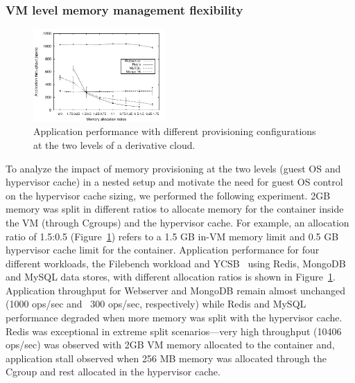 \subsubsection{VM level memory management flexibility}
\label{subsec:sdc}
%
%
\begin{figure}[t]
  \centering
\includegraphics[width=0.45\textwidth]{images/appl_behavior} 
 \caption{Application performance with different provisioning configurations 
  at the two levels of a derivative cloud.}
 \label{fig:app_behavior} 
\end{figure}
%
To analyze the impact of memory provisioning at the two 
levels (guest OS and hypervisor cache) in a nested setup and motivate the need for 
guest OS control on the hypervisor cache sizing, we performed the 
following experiment.
%
2GB memory was split in different ratios to allocate memory for the container 
inside the VM (through Cgroups) and the hypervisor cache.
%
For example, an allocation ratio of 1.5:0.5 (Figure~\ref{fig:app_behavior}) refers to
a 1.5 GB in-VM memory limit and 0.5 GB hypervisor cache limit for
the container. 
%
Application performance for four different workloads,
the Filebench \web{} workload and YCSB~\cite{ycsb} using 
Redis, MongoDB and MySQL data stores,
with different allocation ratios is shown in 
Figure~\ref{fig:app_behavior}. 
%
Application throughput for Webserver and MongoDB remain almost unchanged 
(1000 ops/sec and ~300 ops/sec, respectively) while Redis and MySQL performance 
degraded when more memory was split with the hypervisor cache.
%
Redis was exceptional in extreme split scenarios---very high throughput (10406 ops/sec) was
observed with 2GB VM memory allocated to the container and, application stall observed when 256 MB 
memory was allocated through the Cgroup and rest allocated in the hypervisor cache.
%
